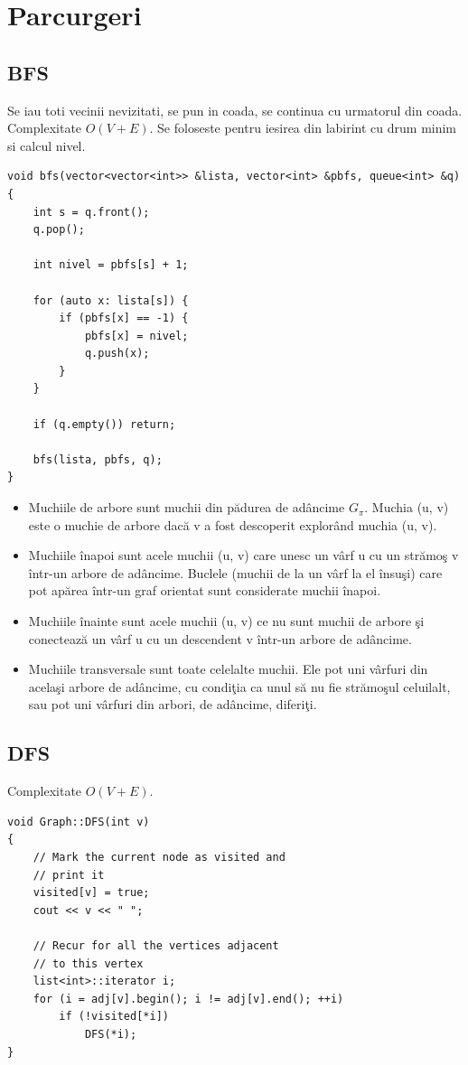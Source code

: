 \documentclass{article}
\begin{document}
\section{Parcurgeri}
\subsection*{BFS} Se iau toti vecinii nevizitati, se pun in coada, se continua cu urmatorul din coada. Complexitate $O(V+E)$. Se foloseste pentru iesirea din labirint cu drum minim si calcul nivel.
\begin{lstlisting}
void bfs(vector<vector<int>> &lista, vector<int> &pbfs, queue<int> &q) {
    int s = q.front();
    q.pop();

    int nivel = pbfs[s] + 1;

    for (auto x: lista[s]) {
        if (pbfs[x] == -1) {
            pbfs[x] = nivel;
            q.push(x);
        }
    }

    if (q.empty()) return;

    bfs(lista, pbfs, q);
}
    \end{lstlisting}

\begin{itemize}
    \item Muchiile de arbore sunt muchii din pădurea de adâncime $G_\pi$. Muchia (u, v) este o muchie de arbore dacă v a fost descoperit explorând muchia (u, v).
    \item Muchiile înapoi sunt acele muchii (u, v) care unesc un vârf u cu un strămoş v într-un arbore de adâncime. Buclele (muchii de la un vârf la el însuşi) care pot apărea într-un graf orientat sunt considerate muchii înapoi.
    \item Muchiile înainte sunt acele muchii (u, v) ce nu sunt muchii de arbore şi conectează un vârf u cu un descendent v într-un arbore de adâncime.
    \item Muchiile transversale sunt toate celelalte muchii. Ele pot uni vârfuri din acelaşi arbore de adâncime, cu condiţia ca unul să nu fie strămoşul celuilalt, sau pot uni vârfuri din arbori, de adâncime, diferiţi.
\end{itemize}

\subsection*{DFS} Complexitate $O(V+E)$.
\begin{lstlisting}
void Graph::DFS(int v)
{
    // Mark the current node as visited and
    // print it
    visited[v] = true;
    cout << v << " ";
 
    // Recur for all the vertices adjacent
    // to this vertex
    list<int>::iterator i;
    for (i = adj[v].begin(); i != adj[v].end(); ++i)
        if (!visited[*i])
            DFS(*i);
}
    \end{lstlisting}
\end{document}
